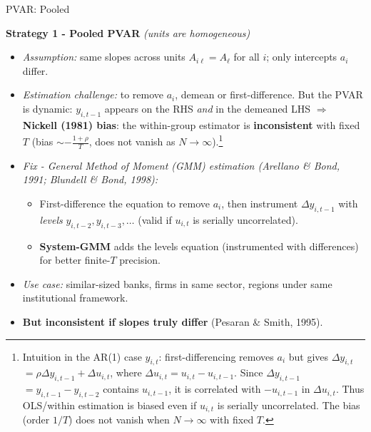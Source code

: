 \documentclass{beamer}
\begin{document}
\begin{frame}{PVAR: Pooled}
\footnotesize

\textbf{Strategy 1 - Pooled PVAR} \quad\textit{(units are homogeneous)}

\smallskip

\begin{itemize}
    \item \textit{Assumption:} same slopes across units $A_{i\ell}=A_\ell$ for all $i$; only intercepts $a_i$ differ.

\item \textit{Estimation challenge:} to remove $a_i$, demean or first-difference. But the PVAR is dynamic: $y_{i,t-1}$ appears on the RHS \emph{and} in the demeaned LHS $\Rightarrow$ \textbf{Nickell (1981) bias}: the within-group estimator is \textbf{inconsistent} with fixed $T$ (bias $\sim -\frac{1+\rho}{T}$, does not vanish as $N\to\infty$).\footnote{\scriptsize
Intuition in the AR(1) case $y_{i,t}$:
first-differencing removes $a_i$ but gives
$\Delta y_{i,t}$ $=\rho \Delta y_{i,t-1}+\Delta u_{i,t}$, where
$\Delta u_{i,t}=u_{i,t}-u_{i,t-1}$. Since $\Delta y_{i,t-1}$ $=y_{i,t-1}-y_{i,t-2}$
contains $u_{i,t-1}$, it is correlated with $-u_{i,t-1}$ in $\Delta u_{i,t}$.
Thus OLS/within estimation is biased even if $u_{i,t}$ is serially uncorrelated.
The bias (order $1/T$) does not vanish when $N\to\infty$ with fixed $T$.}

\item \textit{Fix - General Method of Moment  (GMM) estimation (Arellano \& Bond, 1991; Blundell \& Bond, 1998):}
\begin{itemize}
\footnotesize
  \item First-difference the equation to remove $a_i$, then instrument $\Delta y_{i,t-1}$ with \emph{levels} $y_{i,t-2}, y_{i,t-3},\dots$ (valid if $u_{i,t}$ is serially uncorrelated).
  \item \textbf{System-GMM} adds the levels equation (instrumented with differences) for better finite-$T$ precision.
\end{itemize}

\item \textit{Use case:} similar-sized banks, firms in same sector, regions under same institutional framework.


\item \textbf{But inconsistent if slopes truly differ} (Pesaran \& Smith, 1995).
\end{itemize}

\end{frame}
\end{document}

